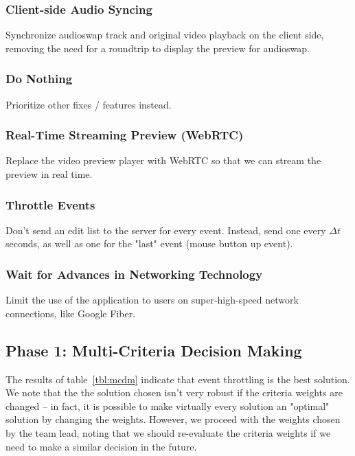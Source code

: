 \documentclass[se,resubmit]{uw-wkrpt}
\begin{document}
\subsubsection{Client-side Audio Syncing}
Synchronize audioswap track and original video playback on the client side,
removing the need for a roundtrip to display the preview for audioswap.

\subsubsection{Do Nothing}
Prioritize other fixes / features instead.

\subsubsection{Real-Time Streaming Preview (WebRTC)}
Replace the video preview player with WebRTC so that we can stream the
preview in real time.

\subsubsection{Throttle Events}
Don't send an edit list to the server for every event. Instead, send one
every $\Delta t$ seconds, as well as one for the "last" event (mouse button up
event).

\subsubsection{Wait for Advances in Networking Technology}
Limit the use of the application to users on super-high-speed network
connections, like Google Fiber.

\subsection{Phase 1: Multi-Criteria Decision Making}
The results of table~\ref{tbl:mcdm} indicate that event throttling is the
best solution. We note that the the solution chosen isn't very robust if
the criteria weights are changed -- in fact, it is possible to make
virtually every solution an "optimal" solution by changing the weights.
However, we proceed with the weights chosen by the team lead, noting that
we should re-evaluate the criteria weights if we need to make a similar
decision in the future.
\end{document}

